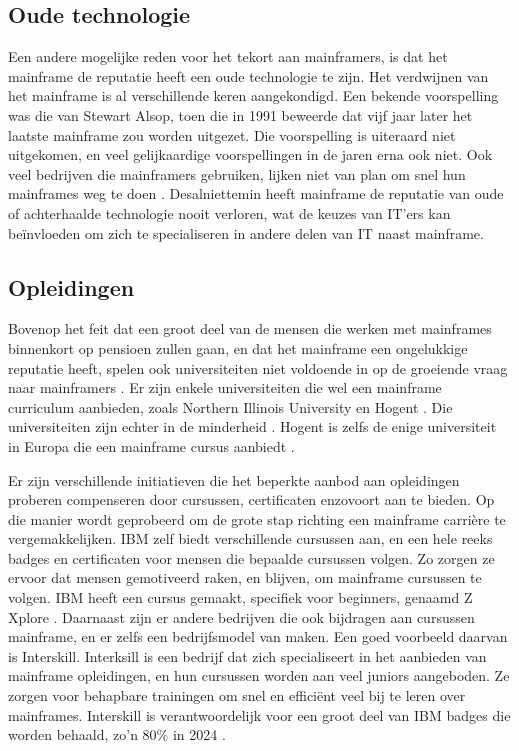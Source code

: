 \subsection{Oude technologie}
Een andere mogelijke reden voor het tekort aan mainframers, is dat het mainframe de reputatie heeft een oude technologie te zijn. Het verdwijnen van het mainframe is al verschillende keren aangekondigd. Een bekende voorspelling was die van Stewart Alsop, toen die in 1991 beweerde dat vijf jaar later het laatste mainframe zou worden uitgezet. Die voorspelling is uiteraard niet uitgekomen, en veel gelijkaardige voorspellingen in de jaren erna ook niet. Ook veel bedrijven die mainframers gebruiken, lijken niet van plan om snel hun mainframes weg te doen \autocite{Barnett2005}. Desalniettemin heeft mainframe de reputatie van oude of achterhaalde technologie nooit verloren, wat de keuzes van IT’ers kan beïnvloeden om zich te specialiseren in andere delen van IT naast mainframe.

\subsection{Opleidingen}
Bovenop het feit dat een groot deel van de mensen die werken met mainframes binnenkort op pensioen zullen gaan, en dat het mainframe een ongelukkige reputatie heeft, spelen ook universiteiten niet voldoende in op de groeiende vraag naar mainframers \autocite{Sagers2018}. Er zijn enkele universiteiten die wel een mainframe curriculum aanbieden, zoals Northern Illinois University en Hogent \autocite{University2026,Blondeel2025}. Die universiteiten zijn echter in de minderheid \autocite{Sochova2012}. Hogent is zelfs de enige universiteit in Europa die een mainframe cursus aanbiedt \autocite{Damme2025}.

Er zijn verschillende initiatieven die het beperkte aanbod aan opleidingen proberen compenseren door cursussen, certificaten enzovoort aan te bieden. Op die manier wordt geprobeerd om de grote stap richting een mainframe carrière te vergemakkelijken. IBM zelf biedt verschillende cursussen aan, en een hele reeks badges en certificaten voor mensen die bepaalde cursussen volgen. Zo zorgen ze ervoor dat mensen gemotiveerd raken, en blijven, om mainframe cursussen te volgen. IBM heeft een cursus gemaakt, specifiek voor beginners, genaamd Z Xplore \autocite{IBM2026}. Daarnaast zijn er andere bedrijven die ook bijdragen aan cursussen mainframe, en er zelfs een bedrijfsmodel van maken. Een goed voorbeeld daarvan is Interskill. Interksill is een bedrijf dat zich specialiseert in het aanbieden van mainframe opleidingen, en hun cursussen worden aan veel juniors aangeboden. Ze zorgen voor behapbare trainingen om snel en efficiënt veel bij te leren over mainframes. Interskill is verantwoordelijk voor een groot deel van IBM badges die worden behaald, zo’n 80\% in 2024 \autocite{Learning2024}.


